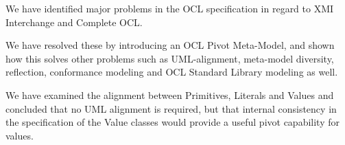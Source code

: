 \documentclass{eceasst}
\begin{document}
We have identified major problems in the OCL specification in regard to XMI Interchange and Complete OCL.

We have resolved these by introducing an OCL Pivot Meta-Model, and shown how this solves other problems such as UML-alignment, meta-model diversity, reflection, conformance modeling and OCL Standard Library modeling as well.

We have examined the alignment between Primitives, Literals and Values and concluded that no UML alignment is required, but that internal consistency in the specification of the Value classes would provide a useful pivot capability for values.  

\nocite{*}


\end{document}

